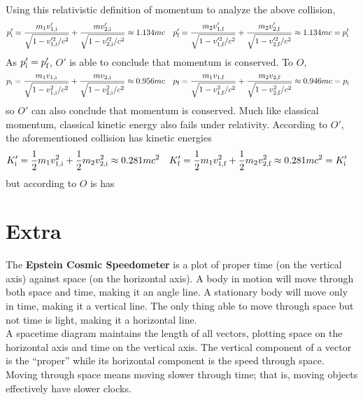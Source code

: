 \documentclass{subfiles}
\begin{document}
			Using this relativistic definition of momentum to analyze the above collision,
			\begin{align*}
				p_{\text{i}}' &= \frac{m_1v_{\text{1,i}}'}{\sqrt{1 - v_{\text{1,i}}'^2/c^2}} + \frac{mv_{\text{2,i}}'}{\sqrt{1 - v_{\text{2,i}}'^2/c^2}}
						\approx 1.134mc &
					p_{\text{f}}' &= \frac{m_2v_{\text{1,f}}'}{\sqrt{1 - v_{\text{1,f}}'^2/c^2}} + \frac{m_2v_{\text{2,f}}'}{\sqrt{1 - v_{\text{2,f}}'^2/c^2}}
						\approx 1.134mc
						= p_{\text{i}}'
			\end{align*}
			As \(p_{\text{i}}' = p_{\text{f}}'\), \(O'\) is able to conclude that momentum is conserved. To \(O\),
			\begin{align*}
				p_{\text{i}} &= \frac{m_1v_{\text{1,i}}}{\sqrt{1 - v_{\text{1,i}}^2/c^2}} + \frac{mv_{\text{2,i}}}{\sqrt{1 - v_{\text{2,i}}^2/c^2}}
						\approx 0.956mc &
					p_{\text{f}} &= \frac{m_1v_{\text{1,f}}}{\sqrt{1 - v_{\text{1,f}}^2/c^2}} + \frac{m_2v_{\text{2,f}}}{\sqrt{1 - v_{\text{2,f}}^2/c^2}}
						\approx 0.946mc
						= p_{\text{i}}
			\end{align*}
			so \(O'\) can also conclude that momentum is conserved.
			Much like classical momentum, classical kinetic energy also fails under relativity. According to \(O'\), the aforementioned collision has kinetic energies
			\begin{align*}
				K_{\text{i}}' &= \frac{1}{2}m_1v_{\text{1,i}}^2 + \frac{1}{2}m_2v_{\text{2,i}}^2 
					\approx 0.281mc^2 &
					K_{\text{f}}' &= \frac{1}{2}m_1v_{\text{1,f}}^2 + \frac{1}{2}m_2v_{\text{2,f}}^2 
						\approx 0.281mc^2
						= K_{\text{i}}'
			\end{align*}
			but according to \(O\) is has
			\[\]
	\section{Extra}
		The \textbf{Epstein Cosmic Speedometer} is a plot of proper time (on the vertical axis) against space (on the horizontal axis). A body in motion will move through both space and time, making it an angle line. A stationary body will move only in time, making it  a vertical line. The only thing able to move through space but not time is light, making it a horizontal line. \\
		A spacetime diagram maintains the length of all vectors, plotting space on the horizontal axis and time on the vertical axis. The vertical component of a vector is the \enquote{proper} while its horizontal component is the speed through space. \\
		Moving through space means moving slower through time; that is, moving objects effectively have slower clocks.
\end{document}
